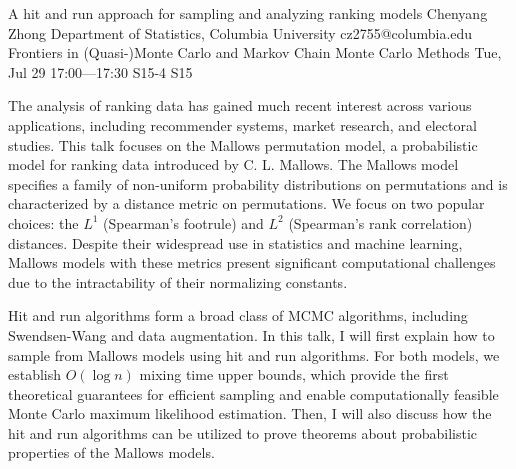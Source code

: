 \begin{talk}
  {A hit and run approach for sampling and analyzing ranking models}%
  {Chenyang Zhong}%
  {Department of Statistics, Columbia University}%
  {cz2755@columbia.edu}%
  {Frontiers in (Quasi-)Monte Carlo and Markov Chain Monte Carlo Methods}%
  {}%
  {Tue, Jul 29 17:00---17:30}%
  {S15-4}%
  {S15}%
    
   
The analysis of ranking data has gained much recent interest across various applications, including recommender systems, market research, and electoral studies. This talk focuses on the Mallows permutation model, a probabilistic model for ranking data introduced by C. L. Mallows. The Mallows model specifies a family of non-uniform probability distributions on permutations and is characterized by a distance metric on permutations. We focus on two popular choices: the $L^1$ (Spearman’s footrule) and $L^2$ (Spearman’s rank correlation) distances. Despite their widespread use in statistics and machine learning, Mallows models with these metrics present significant computational challenges due to the intractability of their normalizing constants.

Hit and run algorithms form a broad class of MCMC algorithms, including Swendsen-Wang and data augmentation. In this talk, I will first explain how to sample from Mallows models using hit and run algorithms. For both models, we establish $O(\log n)$ mixing time upper bounds, which provide the first theoretical guarantees for efficient sampling and enable computationally feasible Monte Carlo maximum likelihood estimation. Then, I will also discuss how the hit and run algorithms can be utilized to prove theorems about probabilistic properties of the Mallows models.

\medskip


\end{talk}

